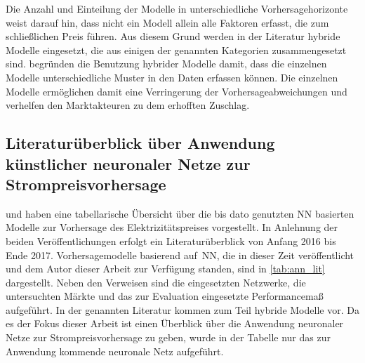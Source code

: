 Die Anzahl und Einteilung der Modelle in unterschiedliche Vorhersagehorizonte weist darauf hin, dass nicht ein Modell allein alle Faktoren erfasst, die zum schließlichen Preis führen. Aus diesem Grund werden in der Literatur hybride Modelle eingesetzt, die aus einigen der genannten Kategorien zusammengesetzt sind. \citet{Cerjan2013} begründen die Benutzung hybrider Modelle damit, dass die einzelnen Modelle unterschiedliche Muster in den Daten erfassen können. Die einzelnen Modelle ermöglichen damit eine Verringerung der Vorhersageabweichungen und verhelfen den Marktakteuren zu dem erhofften Zuschlag.


\subsection{Literaturüberblick über Anwendung künstlicher neuronaler Netze zur Strompreisvorhersage}\label{sec:literaturueberblick}

\citet{Aggarwal2009} und \citet{Panapakidis2016} haben eine tabellarische Übersicht über die bis dato genutzten NN basierten Modelle zur Vorhersage des Elektrizitätspreises vorgestellt. In Anlehnung der beiden Veröffentlichungen erfolgt ein Literaturüberblick von Anfang 2016 bis Ende 2017. 
Vorhersagemodelle basierend auf~NN, die in dieser Zeit veröffentlicht und dem Autor dieser Arbeit zur Verfügung standen, sind in \autoref{tab:ann_lit} dargestellt. Neben den Verweisen sind die eingesetzten Netzwerke, die untersuchten Märkte und das zur Evaluation eingesetzte Performancemaß aufgeführt. In der genannten Literatur kommen zum Teil hybride Modelle vor. Da es der Fokus dieser Arbeit ist einen Überblick über die Anwendung neuronaler Netze zur Strompreisvorhersage zu geben, wurde in der Tabelle nur das zur Anwendung kommende neuronale Netz aufgeführt. 


